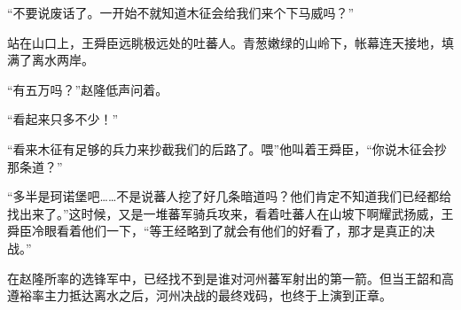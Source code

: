 “不要说废话了。一开始不就知道木征会给我们来个下马威吗？”

站在山口上，王舜臣远眺极远处的吐蕃人。青葱嫩绿的山岭下，帐幕连天接地，填满了离水两岸。

“有五万吗？”赵隆低声问着。

“看起来只多不少！”

“看来木征有足够的兵力来抄截我们的后路了。喂”他叫着王舜臣，“你说木征会抄那条道？”

“多半是珂诺堡吧……不是说蕃人挖了好几条暗道吗？他们肯定不知道我们已经都给找出来了。”这时候，又是一堆蕃军骑兵攻来，看着吐蕃人在山坡下啊耀武扬威，王舜臣冷眼看着他们一下，“等王经略到了就会有他们的好看了，那才是真正的决战。”

在赵隆所率的选锋军中，已经找不到是谁对河州蕃军射出的第一箭。但当王韶和高遵裕率主力抵达离水之后，河州决战的最终戏码，也终于上演到正章。

